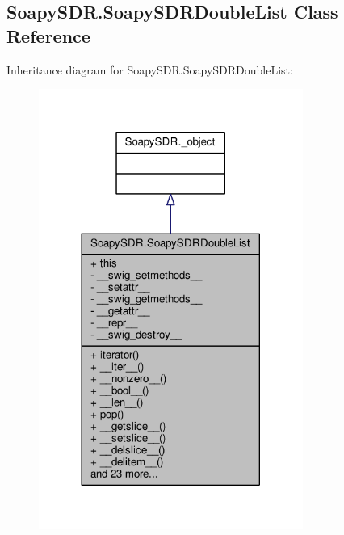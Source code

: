 \subsection{Soapy\+S\+D\+R.\+Soapy\+S\+D\+R\+Double\+List Class Reference}
\label{classSoapySDR_1_1SoapySDRDoubleList}


Inheritance diagram for Soapy\+S\+D\+R.\+Soapy\+S\+D\+R\+Double\+List\+:
\nopagebreak
\begin{figure}[H]
\begin{center}
\leavevmode
\includegraphics[width=245pt]{d9/ddc/classSoapySDR_1_1SoapySDRDoubleList__inherit__graph}
\end{center}
\end{figure}


